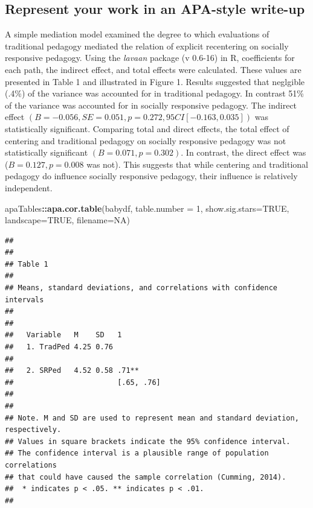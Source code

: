\documentclass[
  11pt,
]{book}
\newenvironment{Shaded}{\begin{snugshade}}{\end{snugshade}}
\newcommand{\AttributeTok}[1]{\textcolor[rgb]{0.27,0.27,0.27}{#1}}
\newcommand{\ConstantTok}[1]{\textcolor[rgb]{0.37,0.37,0.37}{#1}}
\newcommand{\DecValTok}[1]{\textcolor[rgb]{0.06,0.06,0.06}{#1}}
\newcommand{\FunctionTok}[1]{\textcolor[rgb]{0.27,0.27,0.27}{\textbf{#1}}}
\newcommand{\NormalTok}[1]{#1}
\newcommand{\SpecialCharTok}[1]{\textcolor[rgb]{0.43,0.43,0.43}{\textbf{#1}}}
\begin{document}
\hypertarget{represent-your-work-in-an-apa-style-write-up}{%
\subsection*{Represent your work in an APA-style write-up}\label{represent-your-work-in-an-apa-style-write-up}}


A simple mediation model examined the degree to which evaluations of traditional pedagogy mediated the relation of explicit recentering on socially responsive pedagogy. Using the \emph{lavaan} package (v 0.6-16) in R, coefficients for each path, the indirect effect, and total effects were calculated. These values are presented in Table 1 and illustrated in Figure 1. Results suggested that neglgible (.4\%) of the variance was accounted for in traditional pedagogy. In contrast 51\% of the variance was accounted for in socially responsive pedagogy. The indirect effect \((B = -0.056, SE = 0.051, p = 0.272, 95CI[-0.163,0.035])\) was statistically significant. Comparing total and direct effects, the total effect of centering and traditional pedagogy on socially responsive pedagogy was not statistically significant \((B = 0.071, p = 0.302)\). In contrast, the direct effect was (\(B = 0.127, p = 0.008\) was not). This suggests that while centering and traditional pedagogy do influence socially responsive pedagogy, their influence is relatively independent.

\begin{Shaded}
\begin{Highlighting}[]
\NormalTok{apaTables}\SpecialCharTok{::}\FunctionTok{apa.cor.table}\NormalTok{(babydf, }\AttributeTok{table.number =} \DecValTok{1}\NormalTok{, }\AttributeTok{show.sig.stars=}\ConstantTok{TRUE}\NormalTok{, }\AttributeTok{landscape=}\ConstantTok{TRUE}\NormalTok{, }\AttributeTok{filename=}\ConstantTok{NA}\NormalTok{)}
\end{Highlighting}
\end{Shaded}

\begin{verbatim}
## 
## 
## Table 1 
## 
## Means, standard deviations, and correlations with confidence intervals
##  
## 
##   Variable   M    SD   1         
##   1. TradPed 4.25 0.76           
##                                  
##   2. SRPed   4.52 0.58 .71**     
##                        [.65, .76]
##                                  
## 
## Note. M and SD are used to represent mean and standard deviation, respectively.
## Values in square brackets indicate the 95% confidence interval.
## The confidence interval is a plausible range of population correlations 
## that could have caused the sample correlation (Cumming, 2014).
##  * indicates p < .05. ** indicates p < .01.
## 
\end{verbatim}
\end{document}
